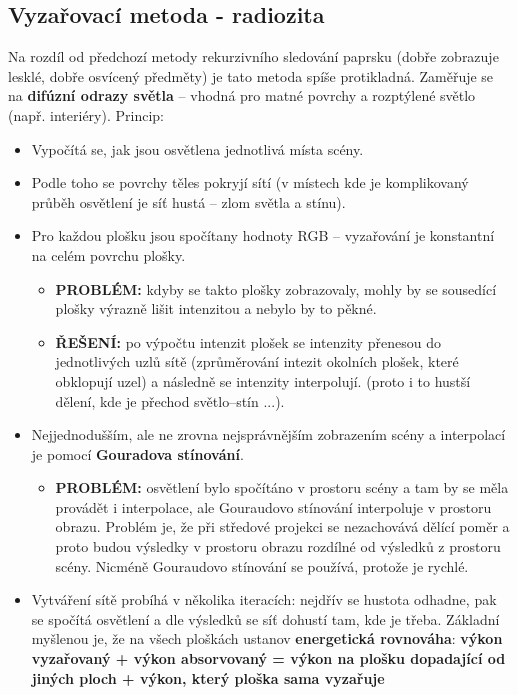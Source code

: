 \subsection{Vyzařovací metoda - radiozita}
Na rozdíl od předchozí metody rekurzivního sledování paprsku (dobře zobrazuje lesklé, dobře osvícený předměty) je tato metoda spíše protikladná. Zaměřuje se na \textbf{difúzní odrazy světla} -- vhodná pro matné povrchy a rozptýlené světlo (např. interiéry). Princip:
\begin{itemize}
\item Vypočítá se, jak jsou osvětlena jednotlivá místa scény.
\item Podle toho se povrchy těles pokryjí sítí (v místech kde je komplikovaný průběh osvětlení je síť hustá -- zlom světla a stínu).
\item Pro každou plošku jsou spočítany hodnoty RGB -- vyzařování je konstantní na celém povrchu plošky.
\begin{itemize}
\item \textbf{PROBLÉM:} kdyby se takto plošky zobrazovaly, mohly by se sousedící plošky výrazně lišit intenzitou a nebylo by to pěkné.
\item 	\textbf{ŘEŠENÍ:} po výpočtu intenzit plošek se intenzity přenesou do jednotlivých uzlů sítě (zprůměrování intezit okolních plošek, které obklopují uzel) a následně se intenzity interpolují. (proto i to hustší dělení, kde je přechod světlo--stín ...).
\end{itemize}
\item Nejjednodušším, ale ne zrovna nejsprávnějším zobrazením scény a interpolací je pomocí \textbf{Gouradova stínování}. 
\begin{itemize}
	\item 	\textbf{PROBLÉM:} osvětlení bylo spočítáno v prostoru scény a tam by se měla provádět i interpolace, ale Gouraudovo stínování interpoluje v prostoru obrazu. Problém je, že při středové projekci se nezachovává dělící poměr a proto budou výsledky v prostoru obrazu rozdílné od výsledků z prostoru scény. Nicméně Gouraudovo stínování se používá, protože je rychlé.
\end{itemize}
\item Vytváření sítě probíhá v několika iteracích: nejdřív se hustota odhadne, pak se spočítá osvětlení a dle výsledků se síť dohustí tam, kde je třeba. Základní myšlenou je, že na všech ploškách ustanov \textbf{energetická rovnováha}: \textbf{ výkon vyzařovaný + výkon absorvovaný = výkon na plošku dopadající od jiných ploch + výkon, který ploška sama vyzařuje} 
\end{itemize}
